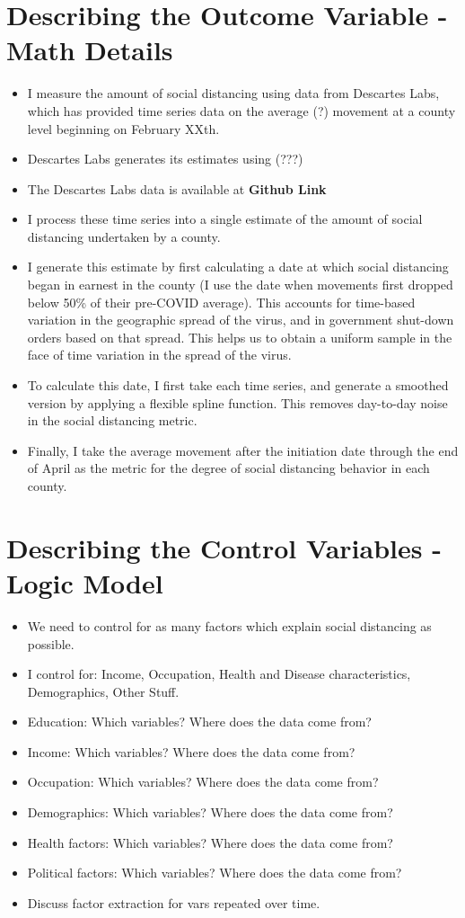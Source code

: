 \documentclass{article}
\begin{document}
\section{Describing the Outcome Variable - Math Details}

\begin{itemize}
	\item I measure the amount of social distancing using data from Descartes Labs, which has provided time series data on the average (?) movement at a county level beginning on February XXth.
	\item Descartes Labs generates its estimates using (???)
	\item The Descartes Labs data is available at \textbf{Github Link}
	\item I process these time series into a single estimate of the amount of social distancing undertaken by a county.
	\item I generate this estimate by first calculating a date at which social distancing began in earnest in the county (I use the date when movements first dropped below 50\% of their pre-COVID average). This accounts for time-based variation in the geographic spread of the virus, and in government shut-down orders based on that spread. This helps us to obtain a uniform sample in the face of time variation in the spread of the virus.
	\item To calculate this date, I first take each time series, and generate a smoothed version by applying a flexible spline function. This removes day-to-day noise in the social distancing metric.
	\item Finally, I take the average movement after the initiation date through the end of April as the metric for the degree of social distancing behavior in each county. 
\end{itemize}

\section{Describing the Control Variables - Logic Model}

\begin{itemize}
	\item We need to control for as many factors which explain social distancing as possible. 
	\item I control for: Income, Occupation, Health and Disease characteristics, Demographics, Other Stuff. 
	\item Education: Which variables? Where does the data come from?
	\item Income: Which variables? Where does the data come from?
	\item Occupation: Which variables? Where does the data come from?
	\item Demographics: Which variables? Where does the data come from?
	\item Health factors: Which variables? Where does the data come from?
	\item Political factors: Which variables? Where does the data come from?
	\item Discuss factor extraction for vars repeated over time. 
\end{itemize}
\end{document}
